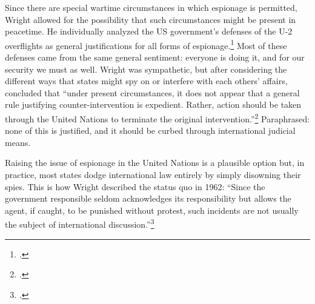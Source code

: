 \documentclass[11pt]{memoir}
\begin{document}
\begin{refsegment}
Since there are special wartime circumstances in which espionage is permitted, Wright allowed for the possibility that such circumstances might be present in peacetime. He individually analyzed the US government's defenses of the U-2 overflights as general justifications for all forms of espionage.\footcite[p.~17. A fun question to ask yourself is whether putting human spies and overflights in the same category elevates the severity of human intelligence or minimizes that of overflights. I think it actually does both, and Wright seemed to agree. An overflying plane is clearly capable of greater physical destruction but ``the difference should not be exaggerated. Although a reconnaissance airplane may carry bombs, a secret agent may plant a bomb and engage in various forms of sabotage.'' (p. 21) The general lack of concern that a spy plane might be carrying bombs is consistently surprising to me. Many of these flights were in retrofitted bombers, completely indistinguishable to enemies from their heavily-armed counterparts. Nonethless, both sides seem willing to treat reconnaissance flights as their own separate thing, and that protection applies to spies as well. As long as spies \emph{don't} engage in sabotage, the fact that they have the potential to do so is irrelevant.]{wright_espionage_1962} Most of these defenses came from the same general sentiment: everyone is doing it, and for our security we must as well. Wright was sympathetic, but after considering the different ways that states might spy on or interfere with each others' affairs, concluded that ``under present circumstances, it does not appear that a general rule justifying counter-intervention is expedient. Rather, action should be taken through the United Nations to terminate the original intervention.''\footcite[p.~22]{wright_espionage_1962} Paraphrased: none of this is justified, and it should be curbed through international judicial means.


Raising the issue of espionage in the United Nations is a plausible option but, in practice, most states dodge international law entirely by simply disowning their spies. This is how Wright described the status quo in 1962: ``Since the government responsible \textelp{} seldom acknowledges its responsibility but allows the agent, if caught, to be punished without protest, such incidents are not usually the subject of international discussion.''\footcite[p.~15. As an argument for not invoking international law, I acutally find this a bit silly. Just because a bank robber never flips on their co-conspirators does not mean those co-conspirators cannot be indicted for their role in committing the crime.]{wright_espionage_1962}


\end{refsegment}
\end{document}
